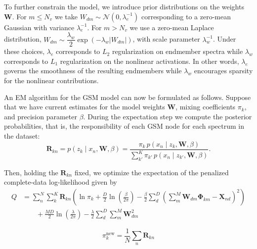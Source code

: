 \documentclass[remotesensing,article,submit,pdftex,moreauthors]{Definitions/mdpi}
\begin{document}
To further constrain the model, we introduce prior distributions on the weights $\mathbf{W}$. For $m\leq N_v$ we take $W_{dm}\sim\mathcal{N}(0, \lambda_e^{-1})$ corresponding to a zero-mean Gaussian with variance $\lambda_e^{-1}$. For $m>N_v$ we use a zero-mean Laplace distribution, $W_{dm}\sim\dfrac{\lambda_w}{2}\exp(-\lambda_w\lvert W_{dm}\rvert)$, with scale parameter $\lambda_w^{-1}$. Under these choices, $\lambda_e$ corresponds to $L_2$ regularization on endmember spectra while $\lambda_w$ corresponds to $L_1$ regularization on the nonlinear activations. In other words, $\lambda_e$ governs the smoothness of the resulting endmembers while $\lambda_w$ encourages sparsity for the nonlinear contributions.

An EM algorithm for the GSM model can now be formulated as follows. Suppose that we have current estimates for the model weights $\mathbf{W}$, mixing coefficients $\pi_k$, and precision parameter $\beta$. During the expectation step we compute the posterior probabilities, that is, the responsibility of each GSM node for each spectrum in the dataset:
\begin{equation}\label{eq:responsibility}
    \mathbf{R}_{kn}  = p(z_k \mid x_n, \mathbf{W}, \beta) = \dfrac{\pi_k \, p(x_n \mid z_k, \mathbf{W}, \beta)}{\sum\limits_{k'}^K \pi_{k'} \, p(x_n \mid z_{k'}, \mathbf{W}, \beta)}.
\end{equation}

Then, holding the $\mathbf{R}_{kn}$ fixed, we optimize the expectation of the penalized complete-data log-likelihood given by
\begin{equation}\label{eq:complete-data-llh}
\begin{aligned}
    Q &= \sum\limits_n^N\sum\limits_k^K \mathbf{R}_{kn} \left(\ln\pi_k + \frac{D}{2}\ln\left(\frac{\beta}{2\pi}\right) - \frac{\beta}{2}\sum\limits_d^D\left(\sum\limits_m^M \mathbf{W}_{dm}\mathbf{\Phi}_{km} - \mathbf{X}_{nd}\right)^2\right) \\ 
    &\qquad + \frac{MD}{2}\ln\left(\frac{\lambda}{2\pi}\right) - \frac{\lambda}{2}\sum\limits_d^D \sum\limits_m^M \mathbf{W}_{dm}^2
\end{aligned}
\end{equation}




\begin{equation}\label{eq:pi-update}
    \pi_k^{\text{new}}  = \frac{1}{N}\sum_n \mathbf{R}_{kn}
\end{equation}
\end{document}
